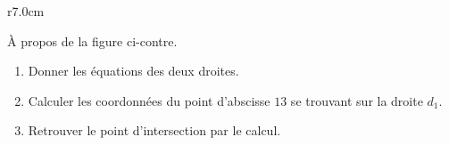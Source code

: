 
\begin{exercice}\label{exosmath-0413}

\begin{wrapfigure}{r}{7.0cm}
    \vspace{-1cm}
    \centering
    
\end{wrapfigure}

        À propos de la figure ci-contre.
        \begin{enumerate}
            \item
                Donner les équations des deux droites.
            \item
                Calculer les coordonnées du point d'abscisse \( 13\) se trouvant sur la droite \( d_1\).
            \item
                Retrouver le point d'intersection par le calcul. 
        \end{enumerate}

\end{exercice}
